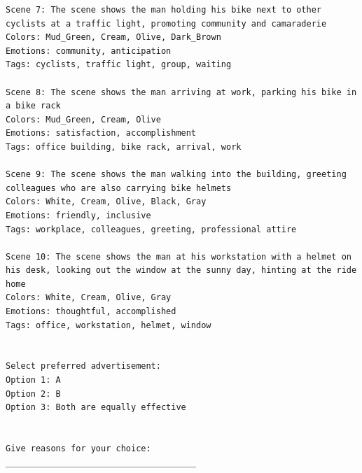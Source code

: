 \begin{lstlisting}[caption={},frame=single,breaklines=true,basicstyle=\tiny, label={lst:form}]
Scene 7: The scene shows the man holding his bike next to other cyclists at a traffic light, promoting community and camaraderie
Colors: Mud_Green, Cream, Olive, Dark_Brown
Emotions: community, anticipation
Tags: cyclists, traffic light, group, waiting

Scene 8: The scene shows the man arriving at work, parking his bike in a bike rack
Colors: Mud_Green, Cream, Olive
Emotions: satisfaction, accomplishment
Tags: office building, bike rack, arrival, work

Scene 9: The scene shows the man walking into the building, greeting colleagues who are also carrying bike helmets
Colors: White, Cream, Olive, Black, Gray
Emotions: friendly, inclusive
Tags: workplace, colleagues, greeting, professional attire

Scene 10: The scene shows the man at his workstation with a helmet on his desk, looking out the window at the sunny day, hinting at the ride home
Colors: White, Cream, Olive, Gray
Emotions: thoughtful, accomplished
Tags: office, workstation, helmet, window


Select preferred advertisement:
Option 1: A
Option 2: B
Option 3: Both are equally effective


Give reasons for your choice:
______________________________________
\end{lstlisting}
